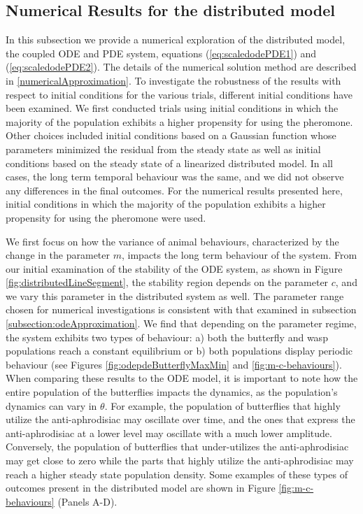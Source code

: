 \documentclass[review,authoryear]{elsarticle}
\newcommand{\origC}{{c}}
\newcommand{\origM}{m}
\begin{document}
\subsection{Numerical Results for the distributed model}
\label{subsection:pdeApproximation}

In this subsection we provide a  numerical exploration of the distributed model, the coupled ODE and PDE system, equations (\ref{eq:scaledodePDE1}) and (\ref{eq:scaledodePDE2}). The details of the numerical solution method are
described in  \ref{numericalApproximation}.
To investigate the robustness of the results with
respect to initial conditions
 for the various trials, different initial conditions have been examined. 
We first conducted trials using initial conditions in which the majority of the population exhibits a higher propensity for using the pheromone.
Other choices included initial conditions based on a Gaussian function whose parameters minimized the residual from the steady state as well as initial conditions based on the steady state of a linearized distributed model. In all cases, the long term temporal behaviour was the same, and we did not observe any differences in the final outcomes.
 For the numerical results presented here, initial conditions in which the majority of the population exhibits a higher propensity for using the pheromone were used. 

We first focus on how the variance of animal behaviours, characterized by the change in the parameter $\origM$, impacts the long term behaviour of the system.
From our initial examination of the stability of the ODE system, as shown in Figure \ref{fig:distributedLineSegment}, the stability region depends on the parameter $\origC$, and we vary this parameter in the distributed system as well.
The parameter
range chosen for numerical investigations is consistent with that examined in subsection
\ref{subsection:odeApproximation}. 
We find that depending on the parameter regime, the system exhibits two types
of behaviour: a) both the butterfly and wasp populations reach a constant equilibrium or b) both populations
display periodic behaviour (see Figures \ref{fig:odepdeButterflyMaxMin} and \ref{fig:m-c-behaviours}). When comparing these results to the ODE model, it is important to note how the entire population of the butterflies impacts the dynamics, as the population's dynamics can vary in $\theta$. For example, the population of butterflies that highly utilize the anti-aphrodisiac may oscillate over time, and the ones that express the anti-aphrodisiac at a lower level may oscillate with a much lower amplitude. Conversely, the population of butterflies that  under-utilizes the anti-aphrodisiac may get close to zero while the parts that highly utilize the anti-aphrodisiac may reach a higher steady state population density. Some examples of these types of outcomes present in the distributed model are shown in Figure \ref{fig:m-c-behaviours} (Panels A-D).
\end{document}
